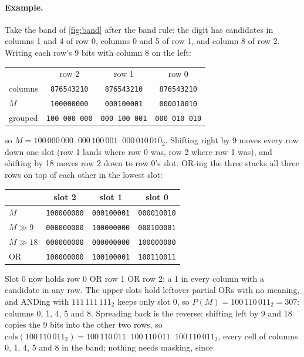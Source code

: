 \documentclass[11pt]{article}
\theoremstyle{definition}
\theoremstyle{plain}
\begin{document}
\paragraph{Example.} Take the band of \cref{fig:band} after the band rule: the digit has candidates in columns 1 and 4
of row 0, columns 0 and 5 of row 1, and column 8 of row 2. Writing each row's 9 bits with column 8 on the left:
\begin{center}
\small
\begin{tabular}{lccc}
 & row 2 & row 1 & row 0 \\
columns & \texttt{876543210} & \texttt{876543210} & \texttt{876543210} \\
\midrule
$M$ & \texttt{100000000} & \texttt{000100001} & \texttt{000010010} \\
grouped & \texttt{100\,000\,000} & \texttt{000\,100\,001} & \texttt{000\,010\,010} \\
\end{tabular}
\end{center}
so $M=100\,000\,000\;\;000\,100\,001\;\;000\,010\,010_2$. Shifting right by 9 moves every row down one slot (row 1 lands where row 0 was, row 2 where row 1
was), and shifting by 18 moves row 2 down to row 0's slot. OR-ing the three stacks all three rows on top of each other in
the lowest slot:
\begin{center}
\small
\begin{tabular}{lccc}
 & slot 2 & slot 1 & slot 0 \\
\midrule
$M$ & \texttt{100000000} & \texttt{000100001} & \texttt{000010010} \\
$M\gg 9$ & \texttt{000000000} & \texttt{100000000} & \texttt{000100001} \\
$M\gg 18$ & \texttt{000000000} & \texttt{000000000} & \texttt{100000000} \\
\midrule
OR & \texttt{100000000} & \texttt{100100001} & \texttt{100110011} \\
\end{tabular}
\end{center}
Slot 0 now holds row 0 OR row 1 OR row 2: a 1 in every column with a candidate in any row. The upper slots hold
leftover partial ORs with no meaning, and ANDing with $111\,111\,111_2$ keeps only slot 0, so $P(M)=100\,110\,011_2=307$: columns 0,
1, 4, 5 and 8. Spreading back is the reverse: shifting left by 9 and 18 copies the 9 bits into the other two rows, so
$\mathrm{cols}(100\,110\,011_2)=100\,110\,011\;\;100\,110\,011\;\;100\,110\,011_2$, every cell of columns 0, 1, 4, 5 and 8 in the band; nothing needs masking, since
\end{document}
